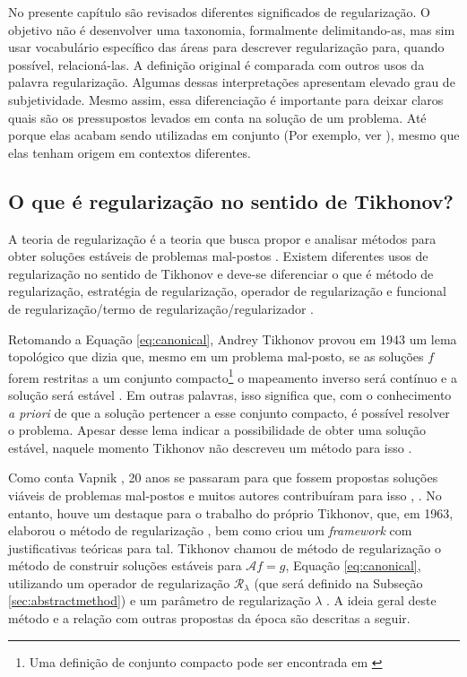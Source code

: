 No presente capítulo são revisados diferentes significados de regularização. O objetivo não é desenvolver uma taxonomia, formalmente delimitando-as, mas sim usar vocabulário específico das áreas para descrever regularização para, quando possível, relacioná-las. A definição original é comparada com outros usos da palavra regularização. Algumas dessas interpretações apresentam elevado grau de subjetividade. Mesmo assim, essa diferenciação é importante para deixar claros quais são os pressupostos levados em conta na solução de um problema. Até porque elas acabam sendo utilizadas em conjunto (Por exemplo, ver \cite[pág. 10]{Kaji2019}), mesmo que elas tenham origem em contextos diferentes.

\subsection{O que é regularização no sentido de Tikhonov?}\label{sec:senseof}

A teoria de regularização é a teoria que busca propor e analisar métodos para obter soluções estáveis de problemas mal-postos \cite{bleyer2015novel, Burger2021}. Existem diferentes usos de regularização no sentido de Tikhonov e deve-se diferenciar o que é método de regularização, estratégia de regularização, operador de regularização e funcional de regularização/termo de regularização/regularizador \cite[Seção 4.3]{Bertero2021}. 

Retomando a Equação \eqref{eq:canonical}, Andrey Tikhonov provou em 1943 um lema topológico que dizia que, mesmo em um problema mal-posto, se as soluções $f$ forem restritas a um conjunto compacto\footnote{Uma definição de conjunto compacto pode ser encontrada em \cite[pág. 55]{Shurman2016}} o mapeamento inverso será contínuo e a solução será estável \cite[pág. 29]{tikhonov1977solutions} \cite[pág. 418]{Vapnik2006}. Em outras palavras, isso significa que, com o conhecimento \textit{a priori} de que a solução pertencer a esse conjunto compacto, é possível resolver o problema. Apesar desse lema indicar a possibilidade de obter uma solução estável, naquele momento Tikhonov não descreveu um método para isso \cite[pág. vii] {Morozov1984}. 

Como conta Vapnik \cite[pág. 418]{Vapnik2006}, 20 anos se passaram para que fossem propostas soluções viáveis de problemas mal-postos e muitos autores contribuíram para isso \cite[págs. 60, 203-4]{hansen2010discrete}, \cite[Introdução]{Morozov1984}. No entanto, houve um destaque para o trabalho do próprio Tikhonov, que, em 1963, elaborou o método de regularização \cite[pág. 46]{tikhonov1977solutions}, bem como criou um \textit{framework} com justificativas teóricas para tal. Tikhonov chamou de método de regularização o método de construir soluções estáveis para $\mathcal{A} f = g$, Equação \eqref{eq:canonical}, utilizando um operador de regularização $\mathcal{R}_{\lambda}$ (que será definido na Subseção \ref{sec:abstractmethod}) e um parâmetro de regularização $\lambda$ \cite[pág. 48]{tikhonov1977solutions}. A ideia geral deste método e a relação com outras propostas da época são descritas a seguir. 

